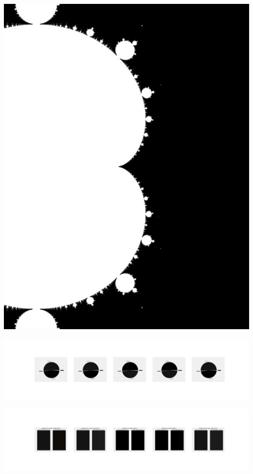 \documentclass[11pt]{article}
\begin{document}
\begin{landscape}
    \begin{center}
    \includegraphics[width=\textwidth]{./nbimg/file (22).jpg}
    \end{center}

    \begin{center}
    \includegraphics[width=250mm]{./nbimg/pie-134.jpg}
    \end{center}

    \begin{center}
    \includegraphics[width=250mm]{./nbimg/peak-134.jpg}
    \end{center}
    


\end{landscape}
\end{document}
